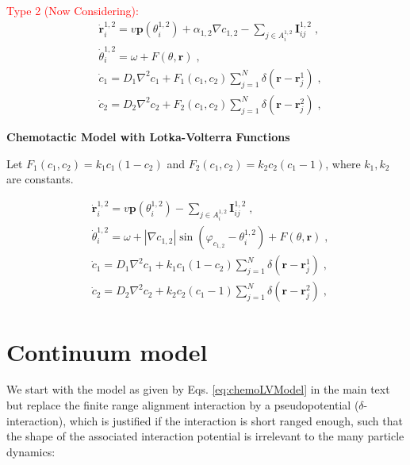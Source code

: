 \documentclass{article}
\begin{document}
\noindent\textcolor{red}{Type 2 (Now Considering):}
\begin{subequations}
    \begin{align}
        &\dot{\mathbf{r}}_{i}^{1,2}=v\mathbf{p}\left( \theta _{i}^{1,2} \right) +\alpha _{1,2}\nabla c_{1,2}-\sum_{j\in A_{i}^{1,2}}{\mathbf{I}_{ij}^{1,2}\;,}\\
        &\dot{\theta}_{i}^{1,2}=\omega + F\left( \theta ,\mathbf{r} \right) \;,\\
        &\dot{c}_1=D_1\nabla ^2c_1+F_1\left( c_1,c_2 \right) \sum_{j=1}^N{\delta \left( \mathbf{r}-\mathbf{r}_{j}^{1} \right) \;,}\\
        &\dot{c}_2=D_2\nabla ^2c_2+F_2\left( c_1,c_2 \right) \sum_{j=1}^N{\delta \left( \mathbf{r}-\mathbf{r}_{j}^{2} \right) \;,}
    \end{align}
\end{subequations}

\noindent\textbf{Chemotactic Model with Lotka-Volterra Functions}

Let $F_1\left( c_1,c_2 \right)=k_1c_1\left( 1-c_2 \right)$ and $F_2\left( c_1,c_2 \right)=k_2c_2\left( c_1-1 \right)$, where $k_1,k_2$ are constants.

\begin{subequations}
    \begin{align}
        &\dot{\mathbf{r}}_{i}^{1,2}=v\mathbf{p}\left( \theta _{i}^{1,2} \right) -\sum_{j\in A_{i}^{1,2}}{\mathbf{I}_{ij}^{1,2}\;,}\label{dotR}\\
        &\dot{\theta}_{i}^{1,2}=\omega + \left| \nabla c_{1,2} \right|\sin \left( \varphi _{c_{1,2}}-\theta _{i}^{1,2} \right) +F\left( \theta ,\mathbf{r} \right) \;,\label{dotTheta}\\
        &\dot{c}_1=D_1\nabla ^2c_1+k_1c_1\left( 1-c_2 \right) \sum_{j=1}^N{\delta \left( \mathbf{r}-\mathbf{r}_{j}^{1} \right)}\;,\\
        &\dot{c}_2=D_2\nabla ^2c_2+k_2c_2\left( c_1-1 \right) \sum_{j=1}^N{\delta \left( \mathbf{r}-\mathbf{r}_{j}^{2} \right)}\;,
    \end{align}
    \label{eq:chemoLVModel}
\end{subequations}

\section{Continuum model}
We start with the model as given by Eqs. \eqref{eq:chemoLVModel} in the main text but replace the finite range alignment interaction by a pseudopotential ($\delta$-interaction), which is justified if the interaction is short ranged enough, such that the shape of the associated interaction potential is irrelevant to the many particle dynamics:
\end{document}
